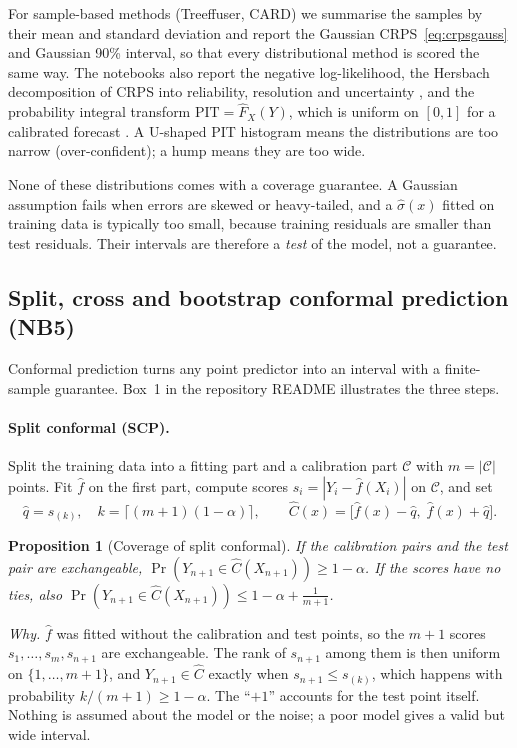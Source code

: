\documentclass[11pt]{article}
\newtheorem{proposition}{Proposition}
\begin{document}
For sample-based methods (Treeffuser, CARD) we summarise the samples by their mean and standard deviation and report the
Gaussian CRPS~\eqref{eq:crpsgauss} and Gaussian 90\% interval, so that every distributional method is scored the same way.
The notebooks also report the negative log-likelihood, the Hersbach decomposition of CRPS into reliability, resolution and
uncertainty \cite{hersbach2000crps}, and the probability integral transform $\mathrm{PIT}=\hat F_X(Y)$, which is uniform on
$[0,1]$ for a calibrated forecast \cite{gneiting2007sharpness,kuleshov2018calibrated}. A U-shaped PIT histogram means the
distributions are too narrow (over-confident); a hump means they are too wide.

\begin{insight}
None of these distributions comes with a coverage guarantee. A Gaussian assumption fails when errors are skewed or
heavy-tailed, and a $\hat\sigma(x)$ fitted on training data is typically too small, because training residuals are
smaller than test residuals. Their intervals are therefore a \emph{test} of the model, not a guarantee.
\end{insight}

\subsection{Split, cross and bootstrap conformal prediction (NB5)}
Conformal prediction \cite{vovk2005alrw,lei2018distribution,angelopoulos2023gentle} turns any point predictor into an
interval with a finite-sample guarantee. Box~1 in the repository README illustrates the three steps.

\paragraph{Split conformal (SCP).} Split the training data into a fitting part and a calibration part
$\mathcal C$ with $m=|\mathcal C|$ points. Fit $\hat f$ on the first part, compute scores $s_i=|Y_i-\hat f(X_i)|$ on
$\mathcal C$, and set
\begin{equation}\label{eq:scp}
\hat q=s_{(k)},\quad k=\big\lceil(m+1)(1-\alpha)\big\rceil,\qquad \hat C(x)=\big[\hat f(x)-\hat q,\;\hat f(x)+\hat q\big].
\end{equation}
\begin{proposition}[Coverage of split conformal]
If the calibration pairs and the test pair are exchangeable, $\Pr(Y_{n+1}\in\hat C(X_{n+1}))\ge1-\alpha$. If the scores
have no ties, also $\Pr(Y_{n+1}\in\hat C(X_{n+1}))\le1-\alpha+\frac1{m+1}$.
\end{proposition}
\emph{Why.} $\hat f$ was fitted without the calibration and test points, so the $m+1$ scores $s_1,\dots,s_m,s_{n+1}$ are
exchangeable. The rank of $s_{n+1}$ among them is then uniform on $\{1,\dots,m+1\}$, and $Y_{n+1}\in\hat C$ exactly when
$s_{n+1}\le s_{(k)}$, which happens with probability $k/(m+1)\ge1-\alpha$. The ``$+1$'' accounts for the test point
itself. Nothing is assumed about the model or the noise; a poor model gives a valid but wide interval.
\end{document}
